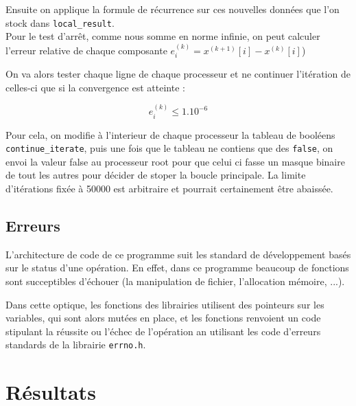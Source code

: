 \documentclass[11pt, a4paper]{article}
\begin{document}
Ensuite on applique la formule de récurrence sur ces nouvelles données que l'on stock dans \texttt{local\_result}.\\

Pour le test d'arr\^et, comme nous somme en norme infinie, on peut calculer l'erreur relative de chaque composante $e^{(k)}_{i} = x^{(k+1)}[i] - x^{(k)}[i]$)

On va alors tester chaque ligne de chaque processeur et ne continuer l'itération de celles-ci que si la convergence est atteinte :

\[
e^{(k)}_{i} \leq 1.10^{-6}
\]

Pour cela, on modifie à l'interieur de chaque processeur la tableau de booléens \texttt{continue\_iterate}, puis une fois que le tableau ne contiens que des \texttt{false}, on envoi la valeur false au processeur root pour que celui ci fasse un masque binaire de tout les autres pour décider de stoper la boucle principale. La limite d'itérations fixée à 50000 est arbitraire et pourrait certainement \^etre abaissée.

\subsection{Erreurs}

L'architecture de code de ce programme suit les standard de développement basés sur le status d'une opération. En effet, dans ce programme beaucoup de fonctions sont succeptibles d'échouer (la manipulation de fichier, l'allocation mémoire, ...).

Dans cette optique, les fonctions des librairies  utilisent des pointeurs sur les variables, qui sont alors mutées en place, et les fonctions renvoient un code stipulant la réussite ou l'échec de l'opération an utilisant les code d'erreurs standards de la librairie \texttt{errno.h}.

\newpage

\section{Résultats}
\end{document}
